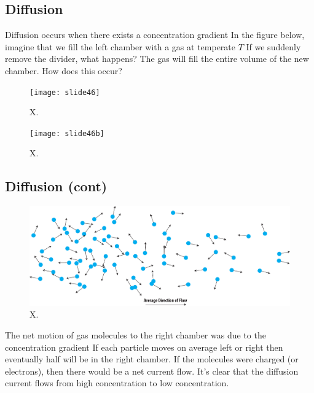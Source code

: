 \subsection{Diffusion}
  
 Diffusion occurs when there exists a concentration gradient
 In the figure below, imagine that we fill the left chamber with a gas at temperate $T$
 If we suddenly remove the divider, what happens?
 The gas will fill the entire volume of the new chamber. How does this occur?
 





\begin{figure}
\begin{center}
\texttt{[image: slide46]}
\end{center}
\caption{X. } \label{fig:slide46}
\end{figure}

\begin{figure}
\begin{center}
\texttt{[image: slide46b]}
\end{center}
\caption{X. } \label{fig:slide46b}
\end{figure}




\subsection{Diffusion (cont)}

\begin{figure}
\begin{center}
\includegraphics[width=.5\columnwidth]{random_flow}
\end{center}
\caption{X. } \label{fig:random_flow}
\end{figure}

  
 The net motion of gas molecules to the right chamber was due to the concentration gradient
 If each particle moves on average left or right then eventually half will be in the right chamber. If the molecules were charged (or electrons), then there would be a net current flow.
 It's clear that the diffusion current flows from high concentration to low concentration.
 





